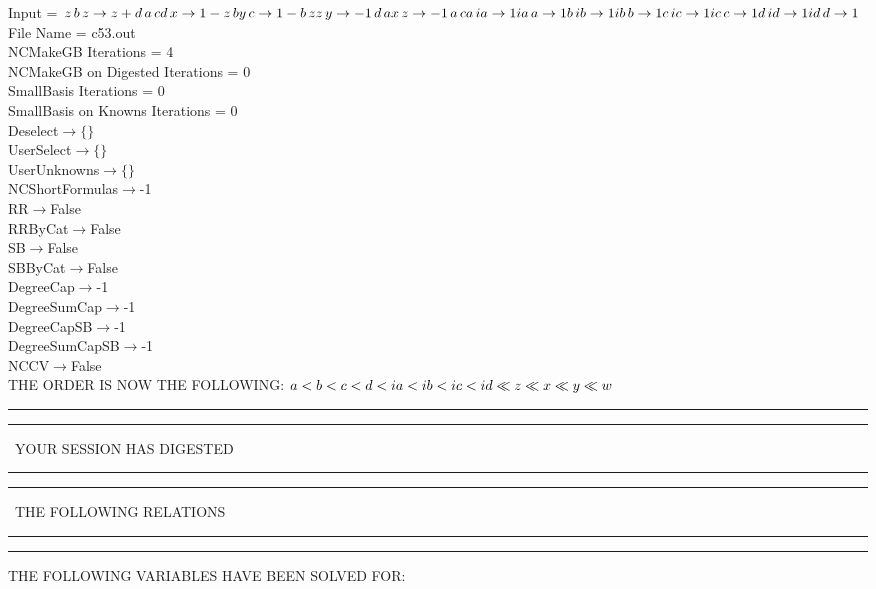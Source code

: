 \documentclass[rep10,leqno]{report}
\begin{document}
\normalsize
\baselineskip=12pt
\noindent
Input = 
$
\\z\,
 b\,
 z\rightarrow z + d\,
 a\,
 c\\
d\,
 x\rightarrow 1 - z\,
 b\\
y\,
 c\rightarrow 1 - b\,
 z\\
z\,
 y\rightarrow -1\,
 d\,
 a\\
x\,
 z\rightarrow -1\,
 a\,
 c\\
a\,
 ia\rightarrow 1\\
ia\,
 a\rightarrow 1\\
b\,
 ib\rightarrow 1\\
ib\,
 b\rightarrow 1\\
c\,
 ic\rightarrow 1\\
ic\,
 c\rightarrow 1\\
d\,
 id\rightarrow 1\\
id\,
 d\rightarrow 1\\
$
File Name = c53.out\\
NCMakeGB Iterations = 4\\
NCMakeGB on Digested Iterations = 0\\
SmallBasis Iterations = 0\\
SmallBasis on Knowns Iterations = 0\\
Deselect$\rightarrow \{\}$\\
UserSelect$\rightarrow \{\}$\\
UserUnknowns$\rightarrow \{\}$\\
NCShortFormulas$\rightarrow$-1\\
RR$\rightarrow $False\\
RRByCat$\rightarrow $False\\
SB$\rightarrow $False\\
SBByCat$\rightarrow $False\\
DegreeCap$\rightarrow $-1\\
DegreeSumCap$\rightarrow $-1\\
DegreeCapSB$\rightarrow $-1\\
DegreeSumCapSB$\rightarrow $-1\\
NCCV$\rightarrow $False\\
THE ORDER IS NOW THE FOLLOWING:\hfil\break
$
a<b<c<d<ia<ib<ic<id\ll
z\ll
x\ll
y\ll
w\\
$
\rule[2pt]{6in}{4pt}\hfil\break
\rule[2pt]{1.879in}{4pt}
\ YOUR SESSION HAS DIGESTED\ 
\rule[2pt]{1.879in}{4pt}\hfil\break
\rule[2pt]{1.923in}{4pt}
\ THE FOLLOWING RELATIONS\ 
\rule[2pt]{1.923in}{4pt}\hfil\break
\rule[2pt]{6in}{4pt}\hfil\break
THE FOLLOWING VARIABLES HAVE BEEN SOLVED FOR:\hfil\break
\end{document}
